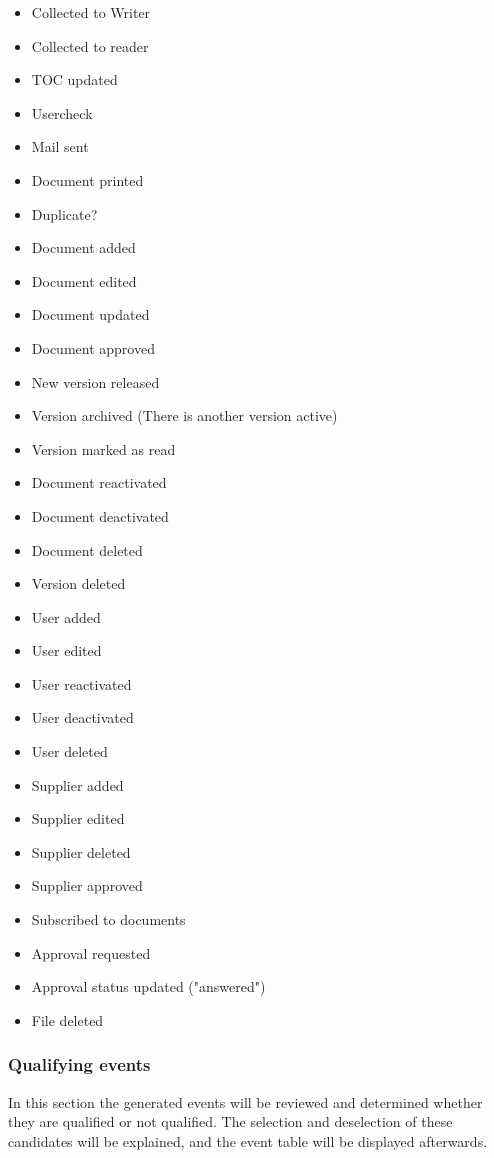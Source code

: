 \begin{itemize}
	\item Collected to Writer
	\item Collected to reader
	\item TOC updated
	\item Usercheck
	\item Mail sent
	\item Document printed
	\item Duplicate?
	\item Document added
	\item Document edited
	\item Document updated
	\item Document approved
	\item New version released
	\item Version archived (There is another version active)
	\item Version marked as read
	\item Document reactivated
	\item Document deactivated
	\item Document deleted
	\item Version deleted
	\item User added
	\item User edited
	\item User reactivated
	\item User deactivated
	\item User deleted
	\item Supplier added
	\item Supplier edited
	\item Supplier deleted 
	\item Supplier approved
	\item Subscribed to documents
	\item Approval requested
	\item Approval status updated ("answered")
	\item File deleted
\end{itemize}

\subsubsection{Qualifying events}
In this section the generated events will be reviewed and determined whether they are qualified or not qualified. The selection and deselection of these candidates will be explained, and the event table will be displayed afterwards.

